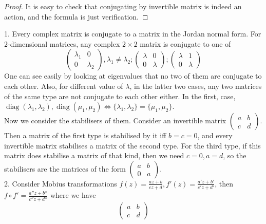 \begin{proof}
    It is easy to check that conjugating by invertible matrix is indeed an action, and the formula is just verification.
\end{proof}
\begin{example}
    1. Every complex matrix is conjugate to a matrix in the Jordan normal form.
    For $2$-dimensional matrices, any complex $2\times 2$ matrix is conjugate to one of
    $$
    \begin{pmatrix}
        \lambda_1&0\\
        0&\lambda_2
    \end{pmatrix},\lambda_1\neq\lambda_2;
    \begin{pmatrix}
        \lambda&0\\
        0&\lambda
    \end{pmatrix};
    \begin{pmatrix}
        \lambda&1\\
        0&\lambda
    \end{pmatrix}
    $$
    One can see easily by looking at eigenvalues that no two of them are conjugate to each other.
    Also, for different value of $\lambda$, in the latter two cases, any two matrices of the same type are not conjugate to each other either.
    In the first, case, $\operatorname{diag}(\lambda_1,\lambda_2),\operatorname{diag}(\mu_1,\mu_2)\iff \{\lambda_1,\lambda_2\}=\{\mu_1,\mu_2\}$.\\
    Now we consider the stabilisers of them.
    Consider an invertible matrix
    $\left(\begin{smallmatrix}
        a&b\\
        c&d
    \end{smallmatrix}\right)$.
    Then a matrix of the first type is stabilised by it iff $b=c=0$, and every invertible matrix stabilises a matrix of the second type.
    For the third type, if this matrix does stabilise a matrix of that kind, then we need $c=0,a=d$, so the stabilisers are the matrices of the form
    $\left(\begin{smallmatrix}
        a&b\\
        0&a
    \end{smallmatrix}\right)$.\\
    2. Consider Mobius transformations $f(z)=\frac{az+b}{cz+d},f'(z)=\frac{a'z+b'}{c'z+d'}$, then $f\circ f'=\frac{a''z+b''}{c''z+d''}$ where we have
    $$\begin{pmatrix}
        a&b\\
        c&d

\end{pmatrix}$$
\end{example}
